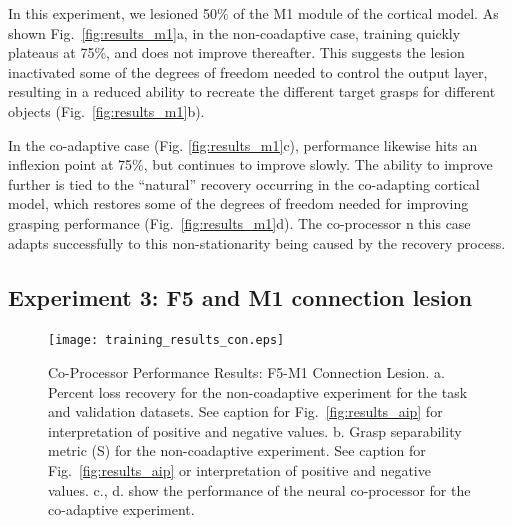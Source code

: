 \documentclass[12pt]{iopart}
\begin{document}
In this experiment, we lesioned 50\% of the M1 module of the cortical model.
As shown Fig.\ \ref{fig:results_m1}a, in the non-coadaptive case, training quickly plateaus at 75\%, and does not improve
thereafter. This suggests the lesion inactivated some of the degrees of freedom needed to
control the output layer, resulting in a reduced ability to recreate the different target grasps
for different objects (Fig.\ \ref{fig:results_m1}b). 


In the co-adaptive case (Fig. \ref{fig:results_m1}c), performance likewise hits an inflexion point at 75\%, but
continues to improve slowly. The ability to improve further is tied to the
``natural'' recovery occurring in the co-adapting cortical model, which restores some of the
degrees of freedom needed for improving grasping performance (Fig.\ \ref{fig:results_m1}d). The co-processor 
n this case adapts successfully to this non-stationarity being caused by the recovery process. 

\subsection{Experiment 3: F5 and M1 connection lesion}
\label{sec:results_con}

\begin{figure}[h]
\centering
\texttt{[image: training\_results\_con.eps]}
\caption{Co-Processor Performance Results: F5-M1 Connection Lesion. 
          a. Percent loss recovery for the non-coadaptive experiment for the task and validation datasets.
          See caption for Fig.~\ref{fig:results_aip} for interpretation of positive and negative values.
          b. Grasp separability metric (S) for the non-coadaptive experiment. See caption for Fig.~\ref{fig:results_aip} 
          or interpretation of positive and negative values. c., d. show the performance of the neural
          co-processor for the co-adaptive experiment.
         }
\label{fig:results_con}
\end{figure}
\end{document}
